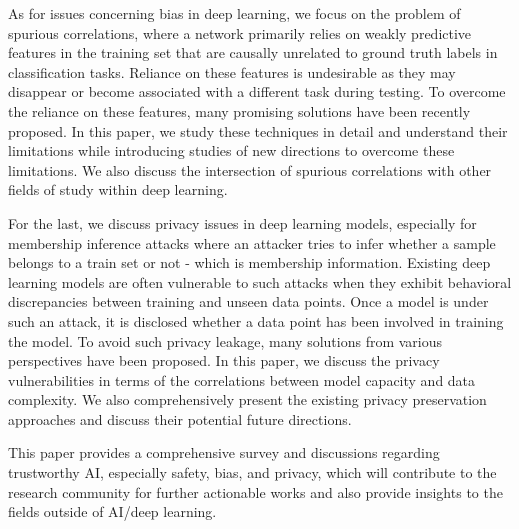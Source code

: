 As for issues concerning bias in deep learning, we focus on the problem of spurious correlations, where a network primarily relies on weakly predictive features in the training set that are causally unrelated to ground truth labels in classification tasks. Reliance on these features is undesirable as they may disappear or become associated with a different task during testing. To overcome the reliance on these features, many promising solutions have been recently proposed. In this paper, we study these techniques in detail and understand their limitations while introducing studies of new directions to overcome these limitations. We also discuss the intersection of spurious correlations with other fields of study within deep learning.


For the last, we discuss privacy issues in deep learning models, especially for membership inference attacks where an attacker tries to infer whether a sample belongs to a train set or not - which is membership information.
Existing deep learning models are often vulnerable to such attacks when they exhibit behavioral discrepancies between training and unseen data points. Once a model is under such an attack, it is disclosed whether a data point has been involved in training the model. To avoid such privacy leakage, many solutions from various perspectives have been proposed. In this paper, we discuss the privacy vulnerabilities in terms of the correlations between model capacity and data complexity. We also comprehensively present the existing privacy preservation approaches and discuss their potential future directions.



This paper provides a comprehensive survey and discussions regarding trustworthy AI, especially safety, bias, and privacy, which will contribute to the research community for further actionable works and also provide insights to the fields outside of AI/deep learning.